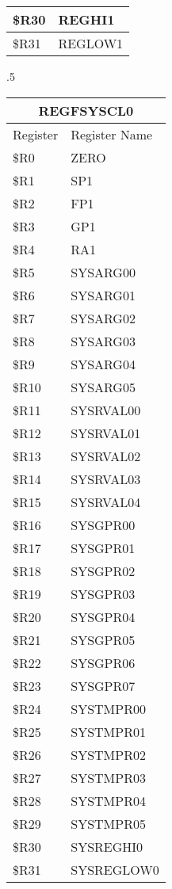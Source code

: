 \documentclass[letterpaper, 11pt]{article}
\begin{document}
\begin{figure}[!h]
{\begin{tabular}{|l|l|}
				\$R30 & REGHI1  \\ \hline
				\$R31 & REGLOW1  \\ \hline
			\end{tabular}
		}
		\hfill
		\parbox{0.25\linewidth}{
			\centering\fontsize{6}{8}\selectfont.5
			\fontsize{6}{8}\selectfont
			\begin{tabular}{|l|l|}
				\hline
				\multicolumn{2}{|c|}{REGFSYSCL0} \\
				\hline
				Register & Register Name \\ \hline
				\$R0  & ZERO \\ 	\hline
				\$R1  & SP1 \\ 	\hline
				\$R2  & FP1 \\ 	\hline
				\$R3  & GP1 \\ 	\hline
				\$R4  & RA1 \\ 	\hline
				\$R5  & SYSARG00 \\ 	\hline
				\$R6  & SYSARG01 \\ 	\hline
				\$R7  & SYSARG02 \\ 	\hline
				\$R8  & SYSARG03 \\ 	\hline
				\$R9  & SYSARG04 \\ 	\hline
				\$R10 & SYSARG05 \\ \hline
				\$R11 & SYSRVAL00  \\ \hline
				\$R12 & SYSRVAL01  \\ \hline
				\$R13 & SYSRVAL02  \\ \hline
				\$R14 & SYSRVAL03  \\ \hline
				\$R15 & SYSRVAL04  \\ \hline
				\$R16 & SYSGPR00  \\ \hline
				\$R17 & SYSGPR01  \\ \hline
				\$R18 & SYSGPR02  \\ \hline
				\$R19 & SYSGPR03  \\ \hline
				\$R20 & SYSGPR04  \\ \hline
				\$R21 & SYSGPR05  \\ \hline
				\$R22 & SYSGPR06  \\ \hline
				\$R23 & SYSGPR07  \\ \hline
				\$R24 & SYSTMPR00  \\ \hline
				\$R25 & SYSTMPR01  \\ \hline
				\$R26 & SYSTMPR02  \\ \hline
				\$R27 & SYSTMPR03  \\ \hline
				\$R28 & SYSTMPR04  \\ \hline
				\$R29 & SYSTMPR05  \\ \hline
				\$R30 & SYSREGHI0  \\ \hline
				\$R31 & SYSREGLOW0  \\ \hline
			\end{tabular}
		}
	\end{figure}
\end{document}
